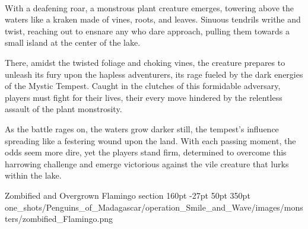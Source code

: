 \vfill\eject

\vspace*{3.5cm}\hfill\\
With a deafening roar, a monstrous plant creature emerges, towering above the waters like a kraken made of vines, roots, and leaves. Sinuous tendrils writhe and twist, reaching out to ensnare any who dare approach, pulling them towards a small island at the center of the lake.

There, amidst the twisted foliage and choking vines, the creature prepares to unleash its fury upon the hapless adventurers, its rage fueled by the dark energies of the Mystic Tempest. Caught in the clutches of this formidable adversary, players must fight for their lives, their every move hindered by the relentless assault of the plant monstrosity.

As the battle rages on, the waters grow darker still, the tempest's influence spreading like a festering wound upon the land. With each passing moment, the odds seem more dire, yet the players stand firm, determined to overcome this harrowing challenge and emerge victorious against the vile creature that lurks within the lake.

\def\primarycolor{titlered}%
\def\secondarycolor{white}%
\MonsterBannerGraphic%
	{Zombified and Overgrown Flamingo} %
	{section} %
	{160pt} %
	{-27pt} %
	{50pt} %
	{350pt} %
	{\PATH one_shots/Penguins_of_Madagascar/operation_Smile_and_Wave/images/monsters/zombified_Flamingo.png} %
	{} %
\label{sec:ZombifiedFlamingo}
%

